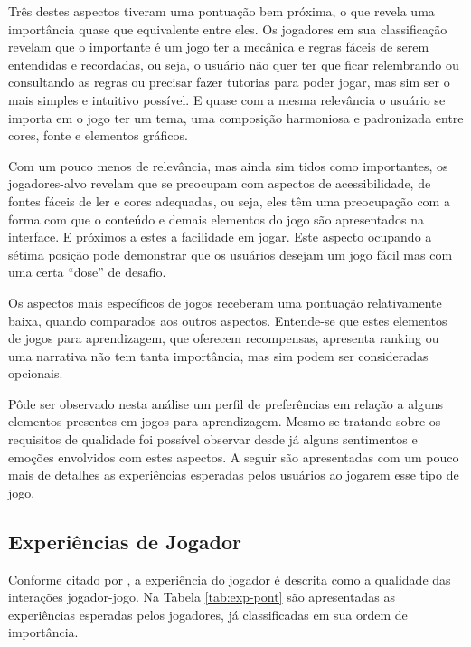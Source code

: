 Três destes aspectos tiveram uma pontuação bem próxima, o que revela uma importância quase que equivalente entre eles. Os jogadores em sua classificação revelam que o importante é um jogo ter a mecânica e regras fáceis de serem entendidas e recordadas, ou seja, o usuário não quer ter que ficar relembrando ou consultando as regras ou precisar fazer tutorias para poder jogar, mas sim ser o mais simples e intuitivo possível. E quase com a mesma relevância o usuário se importa em o jogo ter um tema, uma composição harmoniosa e padronizada entre cores, fonte e elementos gráficos.

Com um pouco menos de relevância, mas ainda sim tidos como importantes, os jogadores-alvo revelam que se preocupam com aspectos de acessibilidade, de fontes fáceis de ler e cores adequadas, ou seja, eles têm uma preocupação com a forma com que o conteúdo e demais elementos do jogo são apresentados na interface. E próximos a estes a facilidade em jogar. Este aspecto ocupando a sétima posição pode demonstrar que os usuários desejam um jogo fácil mas com uma certa ``dose'' de desafio.

Os aspectos mais específicos de jogos receberam uma pontuação relativamente baixa, quando comparados aos outros aspectos. Entende-se que estes elementos de jogos para aprendizagem, que oferecem recompensas, apresenta ranking ou uma narrativa não tem tanta importância, mas sim podem ser consideradas opcionais.

Pôde ser observado nesta análise um perfil de preferências em relação a alguns elementos presentes em jogos para aprendizagem. Mesmo se tratando sobre os requisitos de qualidade foi possível observar desde já alguns sentimentos e emoções envolvidos com estes aspectos. A seguir são apresentadas com um pouco mais de detalhes as experiências esperadas pelos usuários ao jogarem esse tipo de jogo.

\subsection{Experiências de Jogador}

Conforme citado por , a experiência do jogador é descrita como a qualidade das interações jogador-jogo. Na Tabela \ref{tab:exp-pont} são apresentadas as experiências esperadas pelos jogadores, já classificadas em sua ordem de importância.



